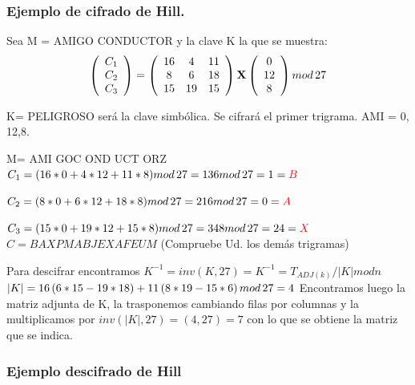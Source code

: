 \documentclass{article}
\begin{document}
\subsubsection{Ejemplo de cifrado de Hill.}

Sea M = AMIGO CONDUCTOR y la clave K la que se muestra:
\begin{equation*}
    \left(
    \begin{array}{c}
    C_1  \\
    C_2  \\
    C_3 
    \end{array} \right) = \left(
    \begin{array}{ccc}
    16 & 4 & 11\\
    8 & 6 & 18\\
    15 & 19 & 15 
    \end{array}
    \right) \mathbf{X} \left(
    \begin{array}{c}
    0 \\
    12\\
    8
    \end{array}
    \right) mod \thinspace 27
\end{equation*}

K= PELIGROSO será la clave simbólica. Se cifrará el primer trigrama. AMI = 0, 12,8.

M= AMI GOC OND UCT ORZ
$C_{1} = (16*0 + 4*12 + 11*8) mod \thinspace 27 = 136 mod \thinspace 27 = 1 = \textcolor{red}{B} $

$C_{2} = (8*0 + 6*12 + 18*8) mod \thinspace 27= 216 mod \thinspace 27 = 0 = \textcolor{red}{A} $

$C_{3} = (15*0 + 19*12 + 15*8) mod \thinspace 27= 348 mod \thinspace 27 = 24 = \textcolor{red}{X}$
$C = BAX PMA BJE XAF EUM$ (Compruebe Ud. los demás trigramas)

Para descifrar encontramos $K^{-1} = inv (K, 27) = K^{-1} = T_{ADJ(k)} / \vert K \vert mod n$ 
$\vert K \vert = 16 \left(6*15-19*18 \right) + 11 \left( 8*19-15*6 \right) mod \thinspace 27 = 4$ 
\justify
Encontramos luego la matriz adjunta de K, la trasponemos cambiando filas por columnas y la multiplicamos por $inv(\vert K \vert , 27) = (4,27) = 7$ con lo que se obtiene la matriz que se indica. 

\subsubsection{Ejemplo descifrado de Hill}
\end{document}
